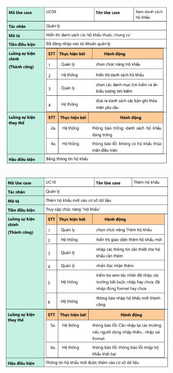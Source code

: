 \documentclass{article}
\begin{document}
\begin{itemize}
    \begin{figure}[H]
        \centering
        \includegraphics[width=0.8\textwidth]{Ảnh chương 2/UC09.png}
    \end{figure}
    \begin{figure}[H]
        \centering
        \includegraphics[width=0.8\textwidth]{Ảnh chương 2/UC10.png}
    \end{figure}
        \begin{figure}[H]
        \centering

\end{figure}
\end{itemize}
\end{document}
